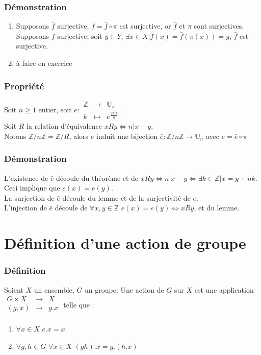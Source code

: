 \documentclass[a4paper, oneside]{report}
\newcommand{\x}{\times}
\newcommand{\Z}{\mathbb{Z}}
\newcommand{\U}{\mathbb{U}}
\begin{document}
\subsubsection{Démonstration}
\begin{enumerate}
\item Supposons $\bar{f}$ surjective, $f=\bar{f}\circ \pi$ est surjective, or $\bar{f}$ et $\pi$ sont surjectives.\\
Supposons $f$ surjective, soit $y\in Y$, $\exists x \in X | f(x)=\bar{f}(\pi(x))=y$, $\bar{f}$ est surjective.
\item à faire en exercice
\end{enumerate}

\subsubsection{Propriété}
Soit $n\geq 1$ entier, soit $e:\begin{array}{lll}
 \Z &\rightarrow &\U_n\\
k&\mapsto&e^{\frac{2\pi i k}{n}}
\end{array}$.\\
Soit $R$ la relation d'équivalence $xRy\Leftrightarrow n|x-y$.\\
Notons $\Z/n\Z=\Z/R$, alors $e$ induit une bijection $\bar{e}:\Z/n\Z \rightarrow \U_n$ avec $e=\bar{e}\circ \pi$

\subsubsection{Démonstration}
L'existence de $\bar{e}$ découle du théorème et de $xRy \Leftrightarrow n|x-y \Leftrightarrow \exists k\in \Z | x=y+nk$.\\
Ceci implique que $e(x)=e(y)$.\\
La surjection de $\bar{e}$ découle du lemme et de la surjectivité de $e$.\\
L'injection de $\bar{e}$ découle de $\forall x,y\in \Z$ $e(x)=e(y)\Leftrightarrow xRy$, et du lemme.

\section{Définition d'une action de groupe}

\subsubsection{Définition}
Soient $X$ un ensemble, $G$ un groupe. Une action de $G$ sur $X$ est une application $\begin{array}{lll}
G\x X &\rightarrow & X\\
(g,x)&\rightarrow & g.x\\
\end{array}$ telle que :
\begin{enumerate}
\item $\forall x\in X$ $e.x=x$\\
\item $\forall g,h\in G$ $\forall x\in X$ $(gh).x=g.(h.x)$
\end{enumerate}
\end{document}
